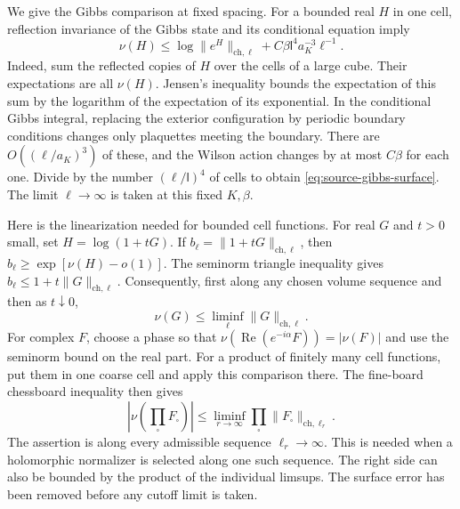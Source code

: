 \documentclass[11pt,letterpaper,reqno]{amsart}
\theoremstyle{definition}
\theoremstyle{remark}
\begin{document}
We give the Gibbs comparison at fixed spacing. For a bounded real $H$
in one cell, reflection invariance of the Gibbs state and its
conditional equation imply
\begin{equation}\label{eq:source-gibbs-surface}
 \nu(H)\le\log\|e^H\|_{\mathrm{ch},\ell}
                   +C\beta\mathsf l^4a_K^{-3}\ell^{-1}.
\end{equation}
Indeed, sum the reflected copies of $H$ over the cells of a large cube.
Their expectations are all $\nu(H)$. Jensen's inequality bounds the
expectation of this sum by the logarithm of the expectation of its
exponential. In the conditional Gibbs integral, replacing the exterior
configuration by periodic boundary conditions changes only plaquettes
meeting the boundary. There are $O((\ell/a_K)^3)$ of these, and the
Wilson action changes by at most $C\beta$ for each one. Divide by the
number $(\ell/\mathsf l)^4$ of cells to obtain
\eqref{eq:source-gibbs-surface}. The limit $\ell\to\infty$ is taken
at this fixed $K,\beta$.

Here is the linearization needed for bounded cell functions. For real
$G$ and $t>0$ small, set $H=\log(1+tG)$. If
$b_\ell=\|1+tG\|_{\mathrm{ch},\ell}$, then
$b_\ell\ge\exp[\nu(H)-o(1)]$. The seminorm triangle inequality gives
$b_\ell\le1+t\|G\|_{\mathrm{ch},\ell}$. Consequently, first along
any chosen volume sequence and then as $t\downarrow0$,
\[
 \nu(G)\le\liminf_\ell\|G\|_{\mathrm{ch},\ell}.
\]
For complex $F$, choose a phase so that
$\nu(\operatorname{Re}(e^{-i\alpha}F))=|\nu(F)|$ and use the
seminorm bound on the real part. For a product of finitely many cell
functions, put them in one coarse cell and apply this comparison there.
The fine-board chessboard inequality then gives
\begin{equation}\label{eq:source-gibbs-product}
 \left|\nu\left(\prod_\square F_\square\right)\right|
  \le\liminf_{r\to\infty}\prod_\square
                          \|F_\square\|_{\mathrm{ch},\ell_r}.
\end{equation}
The assertion is along every admissible sequence $\ell_r\to\infty$.
This is needed when a holomorphic normalizer is selected along one such
sequence. The right side can also be bounded by the product of the
individual limsups. The surface error has been removed before any
cutoff limit is taken.
\end{document}
